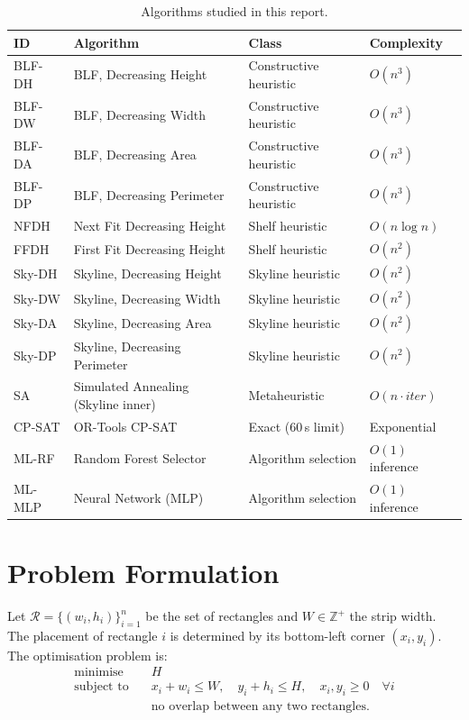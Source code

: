 \documentclass[11pt,a4paper]{article}
\begin{document}
\begin{table}[h]
\centering
\caption{Algorithms studied in this report.}
\label{tab:algorithms}
\begin{tabular}{llll}
\toprule
\textbf{ID} & \textbf{Algorithm} & \textbf{Class} & \textbf{Complexity} \\
\midrule
BLF-DH & BLF, Decreasing Height    & Constructive heuristic & $O(n^3)$ \\
BLF-DW & BLF, Decreasing Width     & Constructive heuristic & $O(n^3)$ \\
BLF-DA & BLF, Decreasing Area      & Constructive heuristic & $O(n^3)$ \\
BLF-DP & BLF, Decreasing Perimeter & Constructive heuristic & $O(n^3)$ \\
NFDH   & Next Fit Decreasing Height  & Shelf heuristic      & $O(n\log n)$ \\
FFDH   & First Fit Decreasing Height & Shelf heuristic      & $O(n^2)$ \\
Sky-DH & Skyline, Decreasing Height  & Skyline heuristic    & $O(n^2)$ \\
Sky-DW & Skyline, Decreasing Width   & Skyline heuristic    & $O(n^2)$ \\
Sky-DA & Skyline, Decreasing Area    & Skyline heuristic    & $O(n^2)$ \\
Sky-DP & Skyline, Decreasing Perimeter & Skyline heuristic  & $O(n^2)$ \\
SA     & Simulated Annealing (Skyline inner) & Metaheuristic  & $O(n\cdot\mathit{iter})$ \\
CP-SAT & OR-Tools CP-SAT         & Exact (60\,s limit)  & Exponential \\
ML-RF  & Random Forest Selector  & Algorithm selection  & $O(1)$ inference \\
ML-MLP & Neural Network (MLP)    & Algorithm selection  & $O(1)$ inference \\
\bottomrule
\end{tabular}
\end{table}

\section{Problem Formulation}

Let \(\mathcal{R} = \{(w_i, h_i)\}_{i=1}^n\) be the set of rectangles and
\(W \in \mathbb{Z}^+\) the strip width.
The placement of rectangle \(i\) is determined by its bottom-left corner
\((x_i, y_i)\).
The optimisation problem is:
\begin{align}
\text{minimise} \quad & H \label{eq:obj}\\
\text{subject to} \quad
  & x_i + w_i \le W, \quad y_i + h_i \le H, \quad x_i,y_i \ge 0
    \quad \forall i \label{eq:bounds}\\
  & \text{no overlap between any two rectangles.} \label{eq:nooverlap}
\end{align}
\end{document}
